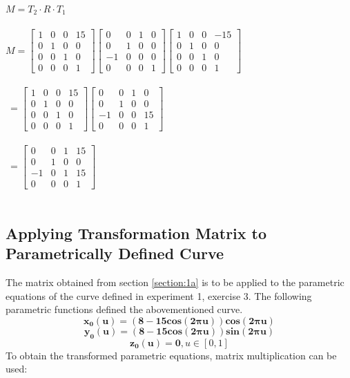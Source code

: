 \documentclass[acmlarge,nonacm=true]{acmart}
\begin{document}
$M = T_2 \cdot R \cdot T_1$\\\\
$M = \begin{bmatrix}
	1 & 0 & 0 & 15 \\
	0 & 1 & 0 & 0 \\
	0 & 0 & 1 & 0 \\
	0 & 0 & 0 & 1
 \end{bmatrix} \begin{bmatrix}
	0 & 0 & 1 & 0 \\
	0 & 1 & 0 & 0 \\
	-1 & 0 & 0 & 0 \\
	0 & 0 & 0 & 1
 \end{bmatrix}\begin{bmatrix}
	1 & 0 & 0 & -15 \\
	0 & 1 & 0 & 0 \\
	0 & 0 & 1 & 0 \\
	0 & 0 & 0 & 1
 \end{bmatrix}$\\\\
 $\ = \begin{bmatrix}
	1 & 0 & 0 & 15 \\
	0 & 1 & 0 & 0 \\
	0 & 0 & 1 & 0 \\
	0 & 0 & 0 & 1
 \end{bmatrix} \begin{bmatrix}
	0 & 0 & 1 & 0 \\
	0 & 1 & 0 & 0 \\
	-1 & 0 & 0 & 15 \\
	0 & 0 & 0 & 1
 \end{bmatrix}$\\\\
 $\ = \begin{bmatrix}
	0 & 0 & 1 & 15 \\
	0 & 1 & 0 & 0 \\
	-1 & 0 & 1 & 15 \\
	0 & 0 & 0 & 1
 \end{bmatrix}$\\\\
\newpage
\subsection{Applying Transformation Matrix to Parametrically Defined Curve}
The matrix obtained from section \ref{section:1a} is to be applied to the parametric
equations of the curve defined in experiment 1, exercise 3.
The following parametric functions defined the abovementioned curve.
\begin{displaymath}
	\mathbf{x_0(u) =  (8 - 15cos(2\pi u))cos(2\pi u)}
\end{displaymath}
\begin{displaymath}
	\mathbf{y_0(u) =  (8 - 15cos(2\pi u))sin(2\pi u)}
\end{displaymath}
\begin{displaymath}
	\mathbf{z_0(u) =  0}, 	u \in [0, 1]
\end{displaymath}
To obtain the transformed parametric equations, matrix multiplication can be used:\\
\end{document}
